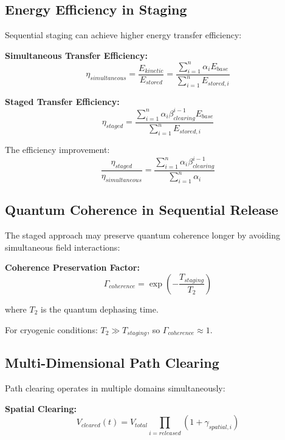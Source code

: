\documentclass[12pt,a4paper]{article}
\begin{document}
\subsection{Energy Efficiency in Staging}

Sequential staging can achieve higher energy transfer efficiency:

\textbf{Simultaneous Transfer Efficiency:}
\begin{equation}
\eta_{simultaneous} = \frac{E_{kinetic}}{E_{stored}} = \frac{\sum_{i=1}^{n} \alpha_i E_{base}}{\sum_{i=1}^{n} E_{stored,i}}
\end{equation}

\textbf{Staged Transfer Efficiency:}
\begin{equation}
\eta_{staged} = \frac{\sum_{i=1}^{n} \alpha_i \beta_{clearing}^{i-1} E_{base}}{\sum_{i=1}^{n} E_{stored,i}}
\end{equation}

The efficiency improvement:
\begin{equation}
\frac{\eta_{staged}}{\eta_{simultaneous}} = \frac{\sum_{i=1}^{n} \alpha_i \beta_{clearing}^{i-1}}{\sum_{i=1}^{n} \alpha_i}
\end{equation}

\subsection{Quantum Coherence in Sequential Release}

The staged approach may preserve quantum coherence longer by avoiding simultaneous field interactions:

\textbf{Coherence Preservation Factor:}
\begin{equation}
\Gamma_{coherence} = \exp\left(-\frac{T_{staging}}{T_2}\right)
\end{equation}

where $T_2$ is the quantum dephasing time.

For cryogenic conditions: $T_2 \gg T_{staging}$, so $\Gamma_{coherence} \approx 1$.

\subsection{Multi-Dimensional Path Clearing}

Path clearing operates in multiple domains simultaneously:

\textbf{Spatial Clearing:}
\begin{equation}
V_{cleared}(t) = V_{total} \prod_{i=released} (1 + \gamma_{spatial,i})
\end{equation}
\end{document}

